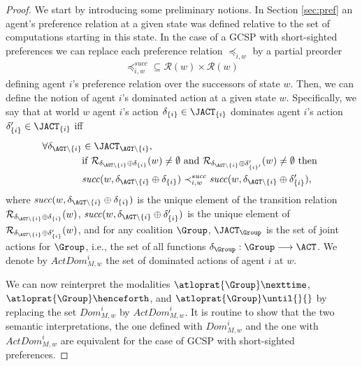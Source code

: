  \begin{proof}

We start by introducing 
some preliminary notions. In Section \ref{sec:pref}
an agent's preference relation at a given state was
defined relative to the set of computations
starting in this state. 
In the case
of a GCSP with short-sighted preferences
we can replace 
each preference relation $     \preceq_{i,w} $
by  a partial preorder 
\begin{align*}
     \preceq_{i,w}^{\mathit{succ} }  \subseteq \mathcal{R}(w) \times \mathcal{R}(w)    
\end{align*}
defining agent $i$'s preference relation over the successors of state $w$.
Then, we can define the notion of agent $i$'s dominated action
at a given state $w$. Specifically, 
we say that at world $w$
  agent $i$'s action  $\delta_{\{ i \}} \in  \JACT_{  \{i \} }   $
  dominates agent $i$'s  action  $\delta_{\{ i \}}' \in  \JACT_{  \{i \} }   $
  iff 
  \begin{align*}
  \forall \delta_{\AGT \setminus \{i \}} & \in \JACT_{\AGT  \setminus \{i \}}, \\  
& 
\text{if }  \mathcal{R}_{ \delta_{\AGT \setminus \{i \}} \oplus  \delta_{\{i \}}  } (w) \neq
\emptyset \text{ and }
 \mathcal{R}_{ \delta_{\AGT \setminus \{i \}} \oplus  \delta_{\{i \}'}  ' } (w) \neq
\emptyset \text{ then } \\
&
\mathit{succ}(w, \delta_{\AGT \setminus \{i \}} \oplus \delta_{\{i \}} )
  \prec_{i,w}^{\mathit{succ} } 
\mathit{succ} ( w, \delta_{\AGT \setminus \{i \}} \oplus  \delta_{\{i \}} ')  ,
  \end{align*}
where $\mathit{succ}(w, \delta_{\AGT \setminus \{i \}} \oplus  \delta_{\{i \}} ) $
is the unique element of the transition relation 
  $\mathcal{R}_{ \delta_{\AGT \setminus \{i \}} \oplus  \delta_{\{i \}}  } (w) $,
 $\mathit{succ}(w, \delta_{\AGT \setminus \{i \}} \oplus  \delta_{\{i \}}' ) $
is the unique element of 
  $\mathcal{R}_{ \delta_{\AGT \setminus \{i \}} \oplus  \delta_{\{i \}}'  } (w) $,
  and for any coalition $\Group$, 
  $\JACT_\Group   $
  is the set of joint actions for $\Group$,
  i.e., the set of all functions $\delta_\Group : \Group \longrightarrow \ACT$. 
   We denote by $\mathit{ActDom}_{M,w}^i$ the set of dominated actions of agent $i$   at $w$.

  We can now reinterpret the modalities $\atloprat{\Group}\nexttime$, $\atloprat{\Group}\henceforth$, and $\atloprat{\Group}\until{}{}$
by replacing the set $\mathit{Dom}_{M,w}^i$ by 
$\mathit{ActDom}_{M,w}^i$. 
It is routine to show that the two semantic interpretations, the one defined with $\mathit{Dom}_{M,w}^i$ and the one with $\mathit{ActDom}_{M,w}^i$ are equivalent for the case of GCSP with short-sighted preferences. 


\end{proof}
